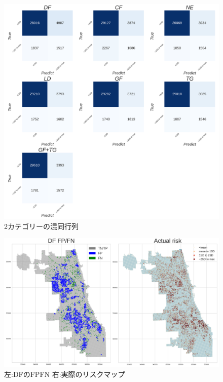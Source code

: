 \begin{figure}
  \centering %
  \includegraphics[scale=0.16]{./add-crime-timeseries-fig/non_crime_no_timeseries_two_cm.png}
  \caption{2カテゴリーの混同行列}
  \label{fig:add-crime-timeseries-2cm}
\end{figure}
\begin{figure}
  \centering %
  \includegraphics[scale=0.25]{./add-crime-timeseries-fig/DF_fnp.png}
  \caption{左:DFのFPFN 右:実際のリスクマップ}
  \label{fig:add-crime-timeseries-df-fnp}
\end{figure}

